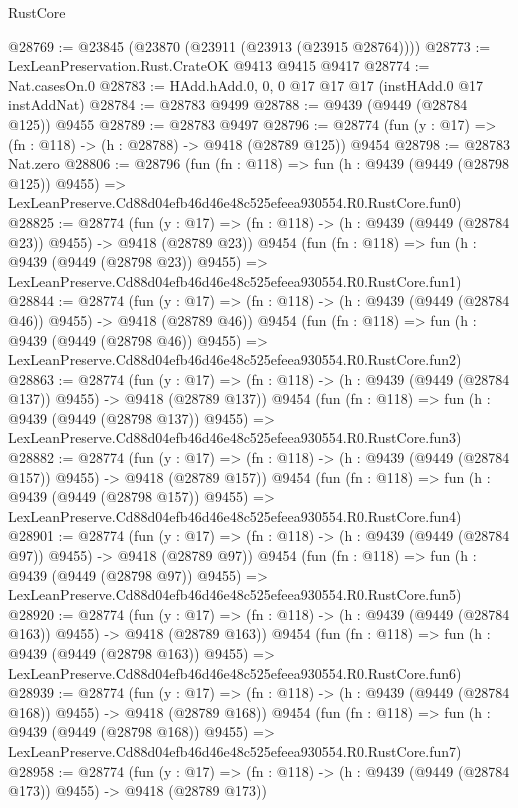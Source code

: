 \begin{lexlean}{RustCore}
\begin{coremodule}
@28769 := @23845 (@23870 (@23911 (@23913 (@23915 @28764))))
@28773 := LexLeanPreservation.Rust.CrateOK @9413 @9415 @9417
@28774 := Nat.casesOn.{0}
@28783 := HAdd.hAdd.{0, 0, 0} @17 @17 @17 (instHAdd.{0} @17 instAddNat)
@28784 := @28783 @9499
@28788 := @9439 (@9449 (@28784 @125)) @9455
@28789 := @28783 @9497
@28796 := @28774 (fun (y : @17) => (fn : @118) -> (h : @28788) -> @9418 (@28789 @125)) @9454
@28798 := @28783 Nat.zero
@28806 := @28796
    (fun (fn : @118) =>
    fun (h : @9439 (@9449 (@28798 @125)) @9455) =>
    LexLeanPreserve.Cd88d04efb46d46e48c525efeea930554.R0.RustCore.fun0)
@28825 := @28774
    (fun (y : @17) => (fn : @118) -> (h : @9439 (@9449 (@28784 @23)) @9455) -> @9418 (@28789 @23))
    @9454
    (fun (fn : @118) =>
    fun (h : @9439 (@9449 (@28798 @23)) @9455) =>
    LexLeanPreserve.Cd88d04efb46d46e48c525efeea930554.R0.RustCore.fun1)
@28844 := @28774
    (fun (y : @17) => (fn : @118) -> (h : @9439 (@9449 (@28784 @46)) @9455) -> @9418 (@28789 @46))
    @9454
    (fun (fn : @118) =>
    fun (h : @9439 (@9449 (@28798 @46)) @9455) =>
    LexLeanPreserve.Cd88d04efb46d46e48c525efeea930554.R0.RustCore.fun2)
@28863 := @28774
    (fun (y : @17) => (fn : @118) -> (h : @9439 (@9449 (@28784 @137)) @9455) -> @9418 (@28789 @137))
    @9454
    (fun (fn : @118) =>
    fun (h : @9439 (@9449 (@28798 @137)) @9455) =>
    LexLeanPreserve.Cd88d04efb46d46e48c525efeea930554.R0.RustCore.fun3)
@28882 := @28774
    (fun (y : @17) => (fn : @118) -> (h : @9439 (@9449 (@28784 @157)) @9455) -> @9418 (@28789 @157))
    @9454
    (fun (fn : @118) =>
    fun (h : @9439 (@9449 (@28798 @157)) @9455) =>
    LexLeanPreserve.Cd88d04efb46d46e48c525efeea930554.R0.RustCore.fun4)
@28901 := @28774
    (fun (y : @17) => (fn : @118) -> (h : @9439 (@9449 (@28784 @97)) @9455) -> @9418 (@28789 @97))
    @9454
    (fun (fn : @118) =>
    fun (h : @9439 (@9449 (@28798 @97)) @9455) =>
    LexLeanPreserve.Cd88d04efb46d46e48c525efeea930554.R0.RustCore.fun5)
@28920 := @28774
    (fun (y : @17) => (fn : @118) -> (h : @9439 (@9449 (@28784 @163)) @9455) -> @9418 (@28789 @163))
    @9454
    (fun (fn : @118) =>
    fun (h : @9439 (@9449 (@28798 @163)) @9455) =>
    LexLeanPreserve.Cd88d04efb46d46e48c525efeea930554.R0.RustCore.fun6)
@28939 := @28774
    (fun (y : @17) => (fn : @118) -> (h : @9439 (@9449 (@28784 @168)) @9455) -> @9418 (@28789 @168))
    @9454
    (fun (fn : @118) =>
    fun (h : @9439 (@9449 (@28798 @168)) @9455) =>
    LexLeanPreserve.Cd88d04efb46d46e48c525efeea930554.R0.RustCore.fun7)
@28958 := @28774
    (fun (y : @17) => (fn : @118) -> (h : @9439 (@9449 (@28784 @173)) @9455) -> @9418 (@28789 @173))

\end{coremodule}
\end{lexlean}
